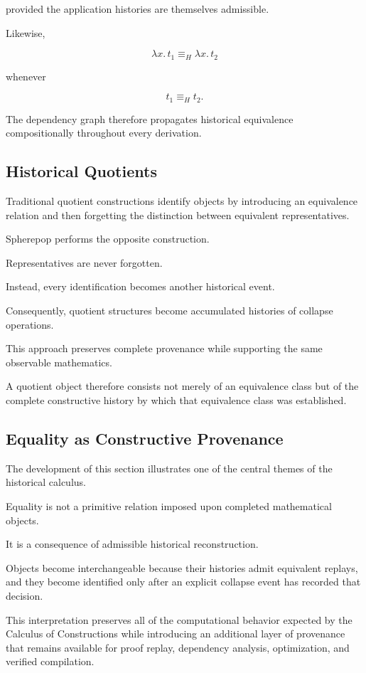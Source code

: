\documentclass[12pt,oneside]{article}
\theoremstyle{definition}
\theoremstyle{remark}
\begin{document}
provided the application histories are themselves admissible.

Likewise,

\[
\lambda x.\,t_1
\equiv_H
\lambda x.\,t_2
\]

whenever

\[
t_1
\equiv_H
t_2.
\]

The dependency graph therefore propagates historical equivalence
compositionally throughout every derivation.

\subsection{Historical Quotients}

Traditional quotient constructions identify objects by introducing an
equivalence relation and then forgetting the distinction between equivalent
representatives.

Spherepop performs the opposite construction.

Representatives are never forgotten.

Instead, every identification becomes another historical event.

Consequently, quotient structures become accumulated histories of collapse
operations.

This approach preserves complete provenance while supporting the same
observable mathematics.

A quotient object therefore consists not merely of an equivalence class but of
the complete constructive history by which that equivalence class was
established.

\subsection{Equality as Constructive Provenance}

The development of this section illustrates one of the central themes of the
historical calculus.

Equality is not a primitive relation imposed upon completed mathematical
objects.

It is a consequence of admissible historical reconstruction.

Objects become interchangeable because their histories admit equivalent
replays, and they become identified only after an explicit collapse event has
recorded that decision.

This interpretation preserves all of the computational behavior expected by the
Calculus of Constructions while introducing an additional layer of provenance
that remains available for proof replay, dependency analysis, optimization, and
verified compilation.
\end{document}
